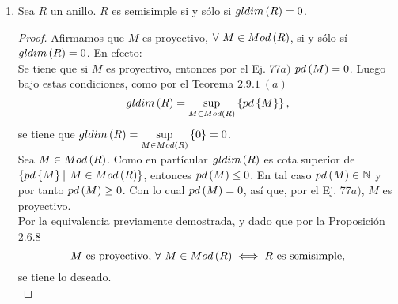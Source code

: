 \documentclass{article}
\begin{document}
\begin{enumerate}[label=\textbf{Ej \arabic*.}]
		\item Sea $R$ un anillo. $R$ es semisimple si y sólo si $gldim\left(R\right)=0$.
		\begin{proof}
			Afirmamos que $M$ es proyectivo, $\forall\ M\in Mod\left(R\right)$, si y sólo sí $gldim\left(R\right)=0$. En efecto:\\
			\boxed{\implies} Se tiene que si $M$ es proyectivo, entonces por el Ej. 77$a)$ $pd\left(M\right)=0$. Luego bajo estas condiciones, como por el Teorema $2.9.1\ (a)$ \begin{equation*}
				gldim\left(R\right)=\sup\limits_{M\in Mod\left(R\right)}\left\{pd\left\{M\right\}\right\},
			\end{equation*} se tiene que $gldim\left(R\right)=\sup\limits_{M\in Mod\left(R\right)}\left\{0\right\}=0$.\\
			\boxed{\impliedby} Sea $M\in Mod\left(R\right)$. Como en partícular $gldim\left(R\right)$ es cota superior de $\lrbrack{pd\lrbrack{M}\ \vline\ M\in Mod\lrprth{R}}$, entonces $pd\left(M\right)\leq 0$. En tal caso $pd\left(M\right)\in\mathbb{N}$ y por tanto $pd\left(M\right)\geq 0$. Con lo cual $pd\left(M\right)=0$, así que, por el Ej. 77$a)$, $M$ es proyectivo.\\
			Por la equivalencia previamente demostrada, y dado que por la Proposición 2.6.8 \begin{equation*}
				 M \text{ es proyectivo, }\forall\ M\in Mod\left(R\right) \iff R\text{ es semisimple,}
			\end{equation*}se tiene lo deseado.\\
		\end{proof}
	\end{enumerate}
\end{document}

